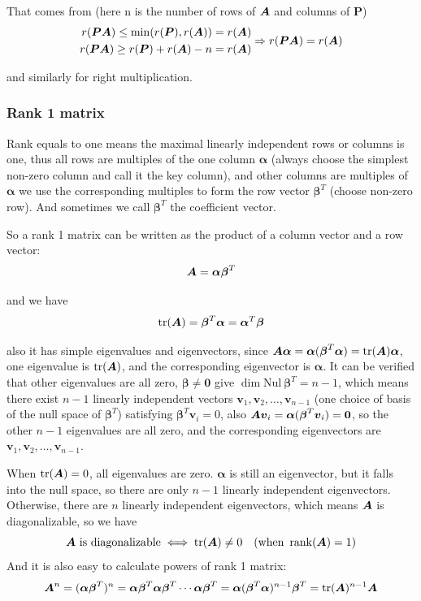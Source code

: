 \documentclass{overview}
\begin{document}
That comes from (here n is the number of rows of $\boldsymbol{A}$ and columns of $\boldsymbol{P}$)
\[
	\begin{aligned}
	r(\boldsymbol{P}\boldsymbol{A}) \leq \min(r(\boldsymbol{P}), r(\boldsymbol{A})) = r(\boldsymbol{A}) \\
	r(\boldsymbol{P}\boldsymbol{A}) \geq r(\boldsymbol{P}) + r(\boldsymbol{A}) - n = r(\boldsymbol{A}) \\
	\end{aligned}
	\Rightarrow r(\boldsymbol{P}\boldsymbol{A}) = r(\boldsymbol{A})
\] 

and similarly for right multiplication.

\subsubsection{Rank 1 matrix}

Rank equals to one means the maximal linearly independent rows or columns is one,
thus all rows are multiples of the one column $\boldsymbol{\alpha}$ (always choose the simplest non-zero 
column and call it the key column), and other columns are multiples of $\boldsymbol{\alpha}$ 
we use the corresponding multiples to form the row vector $\boldsymbol{\beta}^T$
(choose non-zero row). And sometimes we call $\boldsymbol{\beta}^T$ the coefficient vector.

So a rank 1 matrix can be written as the product of a column vector and a row vector:
\[
	\boldsymbol{A} = \boldsymbol\alpha \boldsymbol\beta^T
\]

and we have
\[
\operatorname{tr}(\boldsymbol{A}) = \boldsymbol\beta^T \boldsymbol\alpha = \boldsymbol\alpha^T \boldsymbol\beta
\] 

also it has simple eigenvalues and eigenvectors, since $\boldsymbol{A} \boldsymbol{\alpha} =  \boldsymbol{\alpha} (
\boldsymbol{\beta}^T \boldsymbol{\alpha})=\operatorname{tr}(\boldsymbol{A})\boldsymbol{\alpha}$, one
eigenvalue is $\operatorname{tr}(\boldsymbol{A})$, and the corresponding eigenvector is $\boldsymbol{\alpha}$.
It can be verified that other eigenvalues are all zero, $\boldsymbol{\beta}\neq\boldsymbol{0}$
give $\dim\text{Nul}\ \boldsymbol{\beta}^{T}=n-1$, which means there exist $n-1$ linearly
independent vectors $\boldsymbol{v}_1, \boldsymbol{v}_2, \dots, \boldsymbol{v}_{n-1}$ 
(one choice of basis of the null space of $\boldsymbol{\beta}^{T}$)
satisfying $\boldsymbol{\beta}^{T}\boldsymbol{v}_i=0$, also
$\boldsymbol{A} \boldsymbol{v}_i = \boldsymbol{\alpha}( \boldsymbol{\beta}^{T}\boldsymbol{v}_i)
=\boldsymbol{0}$, so the other $n-1$ eigenvalues are all zero,
and the corresponding eigenvectors are $\boldsymbol{v}_1, \boldsymbol{v}_2, \dots, \boldsymbol{v}_{n-1}$.

When $\operatorname{tr}(\boldsymbol{A})=0$, all eigenvalues are zero. $\boldsymbol{\alpha}$ is still an eigenvector,
but it falls into the null space, so there are only $n-1$ linearly independent eigenvectors.
Otherwise, there are $n$ linearly independent eigenvectors, which means
$\boldsymbol{A}$ is diagonalizable, so we have
\[
	\boldsymbol{A} \text{ is diagonalizable} \iff \operatorname{tr}(\boldsymbol{A}) \ne 0
	\quad(\text{when } \operatorname{rank}(\boldsymbol{A})=1)
\]
And it is also easy to calculate powers of rank 1 matrix:
\[
	\boldsymbol{A}^n = (\boldsymbol\alpha \boldsymbol\beta^T)^n
	= \boldsymbol{\alpha}\boldsymbol{\beta}^T\boldsymbol{\alpha}\boldsymbol{\beta}^T \cdots
	\boldsymbol{\alpha}\boldsymbol{\beta}^T
	= \boldsymbol{\alpha}(\boldsymbol{\beta}^T\boldsymbol{\alpha})^{n-1} \boldsymbol{\beta}^T
	= \operatorname{tr}(\boldsymbol{A})^{n-1}\boldsymbol{A}
\]
\end{document}

